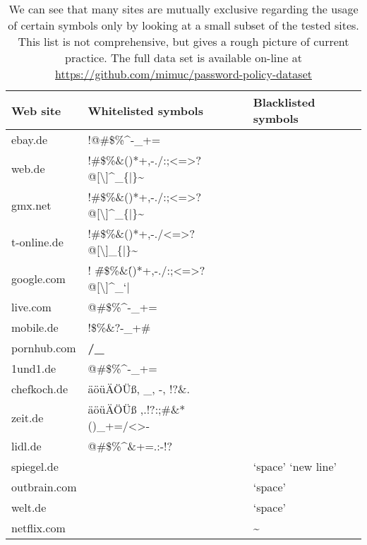 \begin{table}[htbp]
\small
\centering
	\begin{tabular}{lll}
		\textbf{Web site} & \textbf{Whitelisted symbols} & \textbf{Blacklisted symbols}\\ \hline
		ebay.de & !@\#\$\%\textasciicircum*-\_+= & \\
		web.de & !\#\$\%\&()*+,-./:;<=>?@[\textbackslash]\textasciicircum\_\{|\}\textasciitilde{}{\ss} & \\
		gmx.net & !\#\$\%\&()*+,-./:;<=>?@[\textbackslash]\textasciicircum\_\{|\}\textasciitilde{}{\ss} &\\
		t-online.de & !\#\$\%\&()*+,-./<=>?@[\textbackslash]\_\{|\}\textasciitilde &\\
		google.com & ! \"\#\$\%\&\'()*+,-./:;<=>?@[\textbackslash]\textasciicircum \_`{|}~&\\
		live.com & @\#\$\%\textasciicircum*-\_+= &\\
		mobile.de & !\$\%\&?-\_+\# & \\
		pornhub.com & \textbf{/\_} & \\
		1und1.de & @\#\$\%\textasciicircum*-\_+= &\\
		chefkoch.de & äöüÄÖÜ{\ss}, \_, -, !?\&. &\\
		zeit.de & äöüÄÖÜ{\ss} ,.!?:;\#\&* ()\_+=/<>- &\\
		lidl.de & @\#\$\%\textasciicircum\&+=.:-!? &\\
		\bottomrule
		spiegel.de & & `space' `new line' \\
        outbrain.com & & `space' \\
   		welt.de & & `space' \\
   		netflix.com & & \textasciitilde \\
	\end{tabular}
	\caption{We can see that many sites are mutually exclusive regarding the usage of certain symbols only by looking at a small subset of the tested sites. This list is not comprehensive, but gives a rough picture of current practice. The full data set is available on-line at \url{https://github.com/mimuc/password-policy-dataset}}
	\label{tab:policies_reuse:black-white-lists}
\end{table}